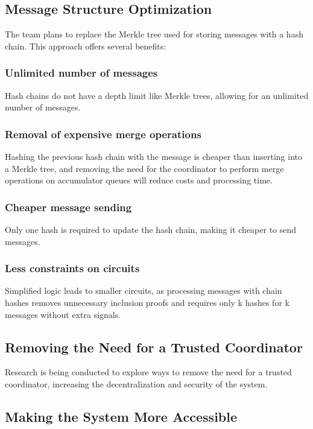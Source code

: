 \documentclass[11pt]{article}
\begin{document}
\subsection{Message Structure Optimization}
\label{sec:org962af30}

The team plans to replace the Merkle tree used for storing messages with a hash chain. This approach offers several benefits:
\subsubsection{Unlimited number of messages}
\label{sec:orgcc544e8}

Hash chains do not have a depth limit like Merkle trees, allowing for an unlimited number of messages.
\subsubsection{Removal of expensive merge operations}
\label{sec:org7788705}

Hashing the previous hash chain with the message is cheaper than inserting into a Merkle tree, and removing the need for the coordinator to perform merge operations on accumulator queues will reduce costs and processing time.
\subsubsection{Cheaper message sending}
\label{sec:orgb23a390}

Only one hash is required to update the hash chain, making it cheaper to send messages.
\subsubsection{Less constraints on circuits}
\label{sec:org534ea22}

Simplified logic leads to smaller circuits, as processing messages with chain hashes removes unnecessary inclusion proofs and requires only k hashes for k messages without extra signals.
\subsection{Removing the Need for a Trusted Coordinator}
\label{sec:orgf47c8d8}

Research is being conducted to explore ways to remove the need for a trusted coordinator, increasing the decentralization and security of the system.
\subsection{Making the System More Accessible}
\label{sec:orgf684035}
\end{document}
